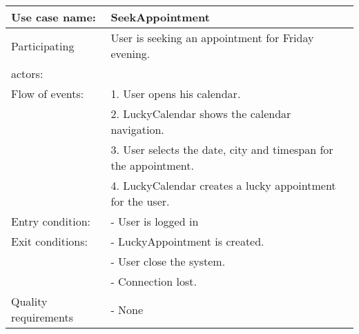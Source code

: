 {\tabulinesep=1.2mm
\begin{tabu}{ | p{3cm} | p{13cm} |}
    \hline
    Use case name: 			& 		SeekAppointment\\ \hline
    Participating  			& 		User is seeking an appointment for Friday evening. \\
    actors:					&		\\ \hline
    Flow of events: 		& 		1. User opens his calendar. \\
							&		2. LuckyCalendar shows the calendar navigation.\\
							&		3. User selects the date, city and timespan for the appointment.\\
							&		4. LuckyCalendar creates a lucky appointment for the user.\\\hline
    Entry condition: 		& 		- User is logged in  \\ \hline
	Exit conditions: 		&		- LuckyAppointment is created.\\
							&		- User close the system.\\
							&		- Connection lost.\\\hline
	Quality requirements	&	 	- None \\\hline
\end{tabu}
}
